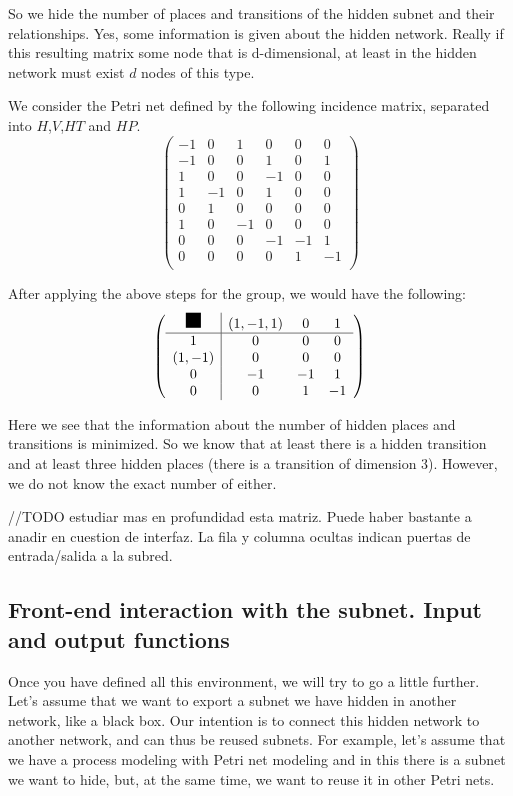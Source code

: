 {So we hide the number of places and transitions of the hidden subnet
and their relationships.
Yes, some information is given about the hidden network. Really if this resulting matrix some node that is d-dimensional, at least in the hidden network must exist $ d $ nodes of this type.
\begin{example}
We consider the Petri net defined by the following incidence matrix, separated into $H$,$V$,$HT$ and $HP$.
\[
\left(
\begin{array}{ccc|ccc}
-1 & 0 & 1 & 0 & 0 & 0\\
-1 & 0 & 0 & 1 & 0 & 1\\
1 & 0 & 0 & -1 & 0 & 0\\
1 & -1 & 0 & 1 & 0 & 0\\
\hline
0 & 1 & 0 & 0 & 0 & 0\\
1 & 0 & -1 & 0 & 0 & 0\\
0 & 0 & 0 & -1 & -1 & 1\\
0 & 0 & 0 & 0 & 1 & -1\\
\end{array}
\right)
\]

After applying the above steps for the group, we would have the following:
\[
\left(
\begin{array}{c|ccc}
\rule{0.15in}{0.15in} & (1,-1,1) & 0 & 1\\
\hline
1  & 0 & 0 & 0\\
(1,-1) & 0 & 0 & 0\\
0 &  -1 & -1 & 1\\
0 &  0 & 1 & -1\\
\end{array}
\right)
\]

Here we see that the information about the number of hidden places and transitions is minimized. So we know that at least there is a hidden transition and at least three hidden places (there is a transition of dimension 3). However, we do not know the exact number of either.
\end{example}

//TODO estudiar mas en profundidad esta matriz. Puede haber bastante a anadir
en cuestion de interfaz. La fila y columna ocultas indican puertas de entrada/salida a la subred.  

\subsection{Front-end interaction with the subnet. Input and output functions}

Once you have defined all this environment, we will try to go a little further. Let's assume that we want to export a subnet we have hidden in another network, like a black box. Our intention is to connect this hidden network to another network, and can thus be reused subnets. For example, let's assume that we have a process modeling with Petri net modeling and in this there is a subnet we want to hide, but, at the same time, we want to reuse it in other Petri nets.

}
